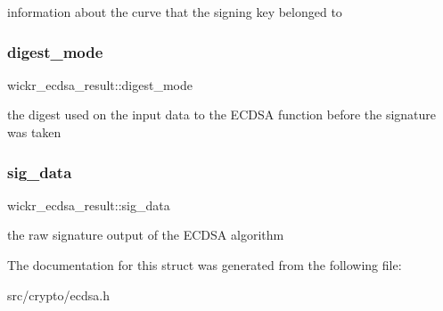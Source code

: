 information about the curve that the signing key belonged to \mbox{\label{structwickr__ecdsa__result_a33c820900693a016ac43702e76b54cff}} 
\subsubsection{\texorpdfstring{digest\+\_\+mode}{digest\_mode}}
{\footnotesize\ttfamily wickr\+\_\+ecdsa\+\_\+result\+::digest\+\_\+mode}

the digest used on the input data to the E\+C\+D\+SA function before the signature was taken \mbox{\label{structwickr__ecdsa__result_ada32a17d9f713f84142fc6a338ebcc48}} 
\subsubsection{\texorpdfstring{sig\+\_\+data}{sig\_data}}
{\footnotesize\ttfamily wickr\+\_\+ecdsa\+\_\+result\+::sig\+\_\+data}

the raw signature output of the E\+C\+D\+SA algorithm 

The documentation for this struct was generated from the following file\+:\begin{DoxyCompactItemize}
\item 
src/crypto/ecdsa.\+h\end{DoxyCompactItemize}
